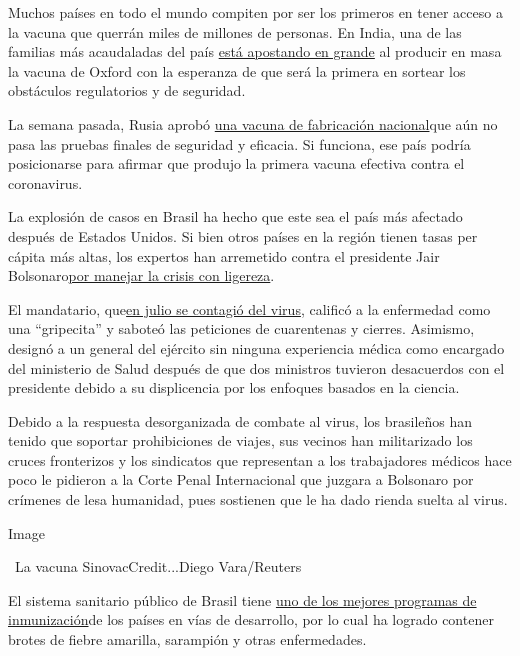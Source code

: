 Muchos países en todo el mundo compiten por ser los primeros en tener
acceso a la vacuna que querrán miles de millones de personas. En India,
una de las familias más acaudaladas del país
\href{https://www.nytimes3xbfgragh.onion/2020/08/01/world/asia/coronavirus-vaccine-india.html}{está
apostando en grande} al producir en masa la vacuna de Oxford con la
esperanza de que será la primera en sortear los obstáculos regulatorios
y de seguridad.

La semana pasada, Rusia aprobó
\href{https://www.nytimes3xbfgragh.onion/es/2020/08/12/espanol/ciencia-y-tecnologia/vacuna-rusia-coronavirus.html}{una
vacuna de fabricación nacional}que aún no pasa las pruebas finales de
seguridad y eficacia. Si funciona, ese país podría posicionarse para
afirmar que produjo la primera vacuna efectiva contra el coronavirus.

La explosión de casos en Brasil ha hecho que este sea el país más
afectado después de Estados Unidos. Si bien otros países en la región
tienen tasas per cápita más altas, los expertos han arremetido contra el
presidente Jair
Bolsonaro\href{https://www.nytimes3xbfgragh.onion/es/2020/04/02/espanol/america-latina/bolsonaro-coronavirus-brasil.html?action=click\&module=RelatedLinks\&pgtype=Article}{por
manejar la crisis con ligereza}.

El mandatario,
que\href{https://www.nytimes3xbfgragh.onion/es/2020/07/07/espanol/america-latina/bolsonaro-coronavirus.html}{en
julio se contagió del virus}, calificó a la enfermedad como una
``gripecita'' y saboteó las peticiones de cuarentenas y cierres.
Asimismo, designó a un general del ejército sin ninguna experiencia
médica como encargado del ministerio de Salud después de que dos
ministros tuvieron desacuerdos con el presidente debido a su
displicencia por los enfoques basados en la ciencia.

Debido a la respuesta desorganizada de combate al virus, los brasileños
han tenido que soportar prohibiciones de viajes, sus vecinos han
militarizado los cruces fronterizos y los sindicatos que representan a
los trabajadores médicos hace poco le pidieron a la Corte Penal
Internacional que juzgara a Bolsonaro por crímenes de lesa humanidad,
pues sostienen que le ha dado rienda suelta al virus.

Image

~La vacuna SinovacCredit...Diego Vara/Reuters

El sistema sanitario público de Brasil tiene
\href{https://www.nytimes3xbfgragh.onion/es/2020/05/18/espanol/america-latina/covid-brasil.html}{uno
de los mejores programas de inmunización}de los países en vías de
desarrollo, por lo cual ha logrado contener brotes de fiebre amarilla,
sarampión y otras enfermedades.

